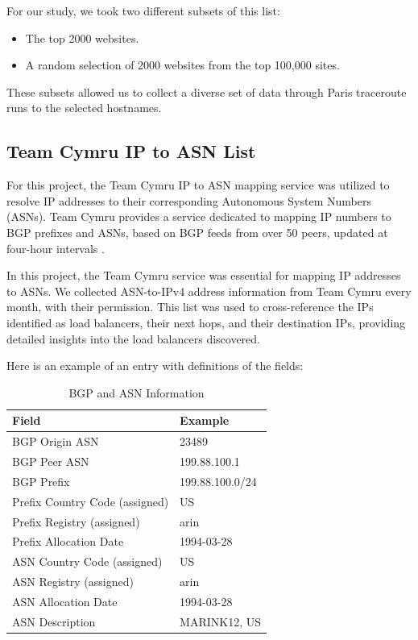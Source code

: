 \documentclass[12pt]{cwru_thesis}
\begin{document}
For our study, we took two different subsets of this list:
\begin{itemize}
    \item The top 2000 websites.
    \item A random selection of 2000 websites from the top 100,000 sites.
\end{itemize}
These subsets allowed us to collect a diverse set of data through Paris traceroute runs to the selected hostnames.

\subsection{Team Cymru IP to ASN List}

For this project, the Team Cymru IP to ASN mapping service was utilized to resolve IP addresses to their corresponding Autonomous System Numbers (ASNs). Team Cymru provides a service dedicated to mapping IP numbers to BGP prefixes and ASNs, based on BGP feeds from over 50 peers, updated at four-hour intervals \cite{Cymru}.

In this project, the Team Cymru service was essential for mapping IP addresses to ASNs. We collected ASN-to-IPv4 address information from Team Cymru every month, with their permission. This list was used to cross-reference the IPs identified as load balancers, their next hops, and their destination IPs, providing detailed insights into the load balancers discovered.

Here is an example of an entry with definitions of the fields:
\begin{table}[h]
    \centering
    \begin{tabular}{|l|l|}
        \hline
        \textbf{Field} & \textbf{Example} \\
        \hline
        BGP Origin ASN & 23489 \\
        \hline
        BGP Peer ASN & 199.88.100.1 \\
        \hline
        BGP Prefix & 199.88.100.0/24 \\
        \hline
        Prefix Country Code (assigned) & US \\
        \hline
        Prefix Registry (assigned) & arin \\
        \hline
        Prefix Allocation Date & 1994-03-28 \\
        \hline
        ASN Country Code (assigned) & US \\
        \hline
        ASN Registry (assigned) & arin \\
        \hline
        ASN Allocation Date & 1994-03-28 \\
        \hline
        ASN Description & MARINK12, US \\
        \hline
    \end{tabular}
    \caption{BGP and ASN Information}
    \label{tab:bgp_asn_info}
\end{table}
\end{document}
